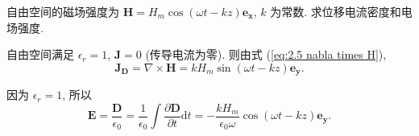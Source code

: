 \begin{exampleprob}[自由空间的电学参数]
    自由空间的磁场强度为 $\bm{H}=H_m\cos(\omega t-kz)\bm{e_x}$, $k$ 为常数. 求位移电流密度和电场强度.

    \begin{solution}
        自由空间满足 $\epsilon_r=1$, $\bm{J}=0$ (传导电流为零). 则由式 (\ref{eq:2.5 nabla times H}),
        \begin{equation}
            \bm{J_D}=\nabla\times\bm{H}=kH_m\sin(\omega t-kz)\bm{e_y}.
        \end{equation}

        因为 $\epsilon_r=1$, 所以
        \begin{equation}
            \bm{E}=\frac{\bm{D}}{\epsilon_0}=\frac{1}{\epsilon_0}\int\frac{\partial\bm{D}}{\partial t}\mathrm{d}t=-\frac{kH_m}{\epsilon_0\omega}\cos(\omega t-kz)\bm{e_y}.
        \end{equation}
    \end{solution}
\end{exampleprob}
